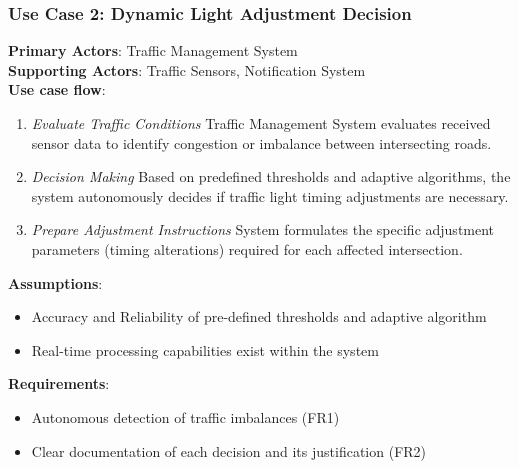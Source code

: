 \documentclass[a4paper,12pt]{article}
\begin{document}
\subsubsection*{Use Case 2: Dynamic Light Adjustment Decision}
\textbf{Primary Actors}: Traffic Management System \\
\textbf{Supporting Actors}: Traffic Sensors, Notification System \\
\textbf{Use case flow}: 
\begin{enumerate}
    \item \textit{Evaluate Traffic Conditions} Traffic Management System evaluates received sensor data to identify congestion or imbalance between intersecting roads.
    \item \textit{Decision Making} Based on predefined thresholds and adaptive algorithms, the system autonomously decides if traffic light timing adjustments are necessary.
    \item \textit{Prepare Adjustment Instructions} System formulates the specific adjustment parameters (timing alterations) required for each affected intersection.
\end{enumerate}
\textbf{Assumptions}: 
\begin{itemize}
    \item Accuracy and Reliability of pre-defined thresholds and adaptive algorithm
    \item Real-time processing capabilities exist within the system
\end{itemize} 
\textbf{Requirements}: 
\begin{itemize}
    \item Autonomous detection of traffic imbalances (FR1)
    \item Clear documentation of each decision and its justification (FR2)
\end{itemize}
\end{document}
